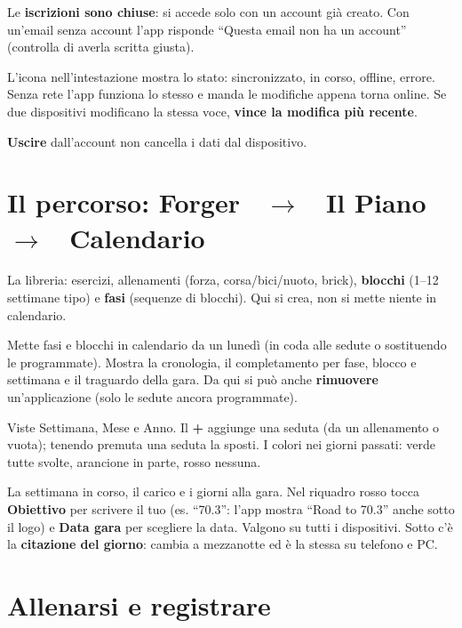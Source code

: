 \documentclass[11pt,a4paper]{article}
\newcommand{\ra}{\unskip\nobreak\ $\rightarrow$\ \ignorespaces}            %
\newcommand{\bt}[1]{\textbf{#1}}               %
\begin{document}
Le \bt{iscrizioni sono chiuse}: si accede solo con un account già creato. Con un'email senza
account l'app risponde ``Questa email non ha un account'' (controlla di averla scritta giusta).

L'icona nell'intestazione mostra lo stato: sincronizzato, in corso, offline, errore. Senza rete
l'app funziona lo stesso e manda le modifiche appena torna online. Se due dispositivi modificano
la stessa voce, \bt{vince la modifica più recente}.

\bt{Uscire} dall'account non cancella i dati dal dispositivo.

\section{Il percorso: Forger \texorpdfstring{\ra}{→} Il Piano \texorpdfstring{\ra}{→} Calendario}\label{sec:percorso}

\begin{description}[style=nextline, leftmargin=0pt, itemsep=6pt]
  \item[Forger] La libreria: esercizi, allenamenti (forza, corsa/bici/nuoto, brick),
    \bt{blocchi} (1--12 settimane tipo) e \bt{fasi} (sequenze di blocchi). Qui si crea,
    non si mette niente in calendario.
  \item[Il Piano] Mette fasi e blocchi in calendario da un lunedì (in coda alle sedute o
    sostituendo le programmate). Mostra la cronologia, il completamento per fase, blocco e
    settimana e il traguardo della gara. Da qui si può anche \bt{rimuovere} un'applicazione
    (solo le sedute ancora programmate).
  \item[Calendario] Viste Settimana, Mese e Anno. Il \bt{+} aggiunge una seduta (da un
    allenamento o vuota); tenendo premuta una seduta la sposti. I colori nei giorni passati:
    verde tutte svolte, arancione in parte, rosso nessuna.
  \item[Panoramica] La settimana in corso, il carico e i giorni alla gara. Nel riquadro rosso
    tocca \bt{Obiettivo} per scrivere il tuo (es. ``70.3'': l'app mostra ``Road to 70.3'' anche
    sotto il logo) e \bt{Data gara} per scegliere la data. Valgono su tutti i dispositivi.
    Sotto c'è la \bt{citazione del giorno}: cambia a mezzanotte ed è la stessa su telefono e PC.
\end{description}

\section{Allenarsi e registrare}\label{sec:allenarsi}
\end{document}
